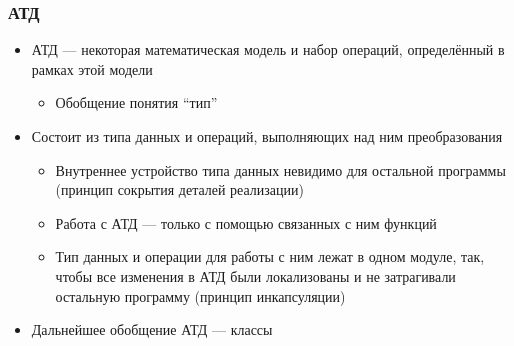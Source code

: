 \documentclass{../../slides-style}
\begin{document}
    
    \begin{frame}[plain]
        \titlepage
    \end{frame}
    
    \begin{frame}
        \frametitle{АТД}
        \begin{itemize}
            \item АТД --- некоторая математическая модель и набор операций, определённый в рамках этой модели
            \begin{itemize}
                \item Обобщение понятия \enquote{тип}
            \end{itemize}
            \item Состоит из типа данных и операций, выполняющих над ним преобразования
            \begin{itemize}
                \item Внутреннее устройство типа данных невидимо для остальной программы (принцип сокрытия деталей реализации)
                \item Работа с АТД --- только с помощью связанных с ним функций
                \item Тип данных и операции для работы с ним лежат в одном модуле, так, чтобы все изменения в АТД были локализованы и не затрагивали остальную программу (принцип инкапсуляции)
            \end{itemize}
            \item Дальнейшее обобщение АТД --- классы
        \end{itemize}
    \end{frame}
\end{document}

